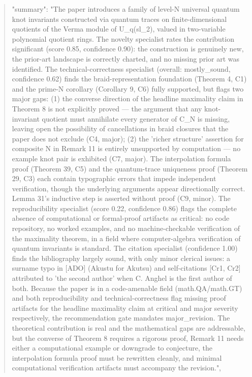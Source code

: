 \documentclass[11pt]{article}
\begin{document}
\begin{quote}
  "summary": "The paper introduces a family of level-N universal quantum knot invariants constructed via quantum traces on finite-dimensional quotients of the Verma module of U\_q(sl\_2), valued in two-variable polynomial quotient rings. The novelty specialist rates the contribution significant (score 0.85, confidence 0.90): the construction is genuinely new, the prior-art landscape is correctly charted, and no missing prior art was identified. The technical-correctness specialist (overall: mostly\_sound, confidence 0.62) finds the braid-representation foundation (Theorem 4, C1) and the prime-N corollary (Corollary 9, C6) fully supported, but flags two major gaps: (1) the converse direction of the headline maximality claim in Theorem 8 is not explicitly proved --- the argument that any knot-invariant quotient must annihilate every generator of C\_N is missing, leaving open the possibility of cancellations in braid closures that the paper does not exclude (C4, major); (2) the 'richer structure' assertion for composite N in Remark 11 is entirely unsupported by computation --- no example knot pair is exhibited (C7, major). The interpolation formula proof (Theorem 39, C5) and the quantum-trace uniqueness proof (Theorem 29, C3) each contain typographic errors that impede independent verification, though the underlying arguments appear directionally correct. Lemma 31's inductive step is asserted without proof (C9, minor). The reproducibility specialist (score 0.22, confidence 0.86) flags the complete absence of computational or formal-proof artifacts as critical: no code repository, no worked examples, and no machine-checkable verification of the maximality theorem, in a field where computer-algebra verification of quantum invariants is standard. The citation specialist (confidence 1.00) finds the bibliography largely sound, with only minor clerical issues: a surname typo in [ADO] (Akustu for Akutsu) and self-citations [Cr1, Cr2] attributed to 'the second author' when C. Anghel is the first author of both. Because the paper is in a code-amenable field (math.QA/math.GT) and both reproducibility and technical-correctness flag missing proof artifacts for the headline maximality claim at critical and major severity respectively, the recommendation gate mandates major\_revision. The theoretical contribution is real and the mathematical gaps are addressable, but the converse of Theorem 8 requires a rigorous proof, Remark 11 needs either a computational example or downgrade to conjecture, the interpolation formula proof must be rewritten cleanly, and minimal computational verification artifacts must accompany the revision.",\\

\end{quote}
\end{document}
